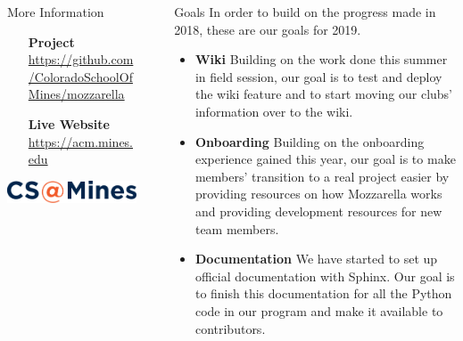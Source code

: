 \documentclass[final]{beamer}
\newlength{\sepwid}
\newlength{\onecolwid}
\begin{document}
\begin{frame}[t]
\begin{columns}[t]
\begin{column}{\onecolwid}
\begin{alertblock}{More Information}
\begin{enumerate}[leftmargin=11.5cm, labelsep=1cm]
                        \item[\textbf{Project}]
                            \href{https://github.com/ColoradoSchoolOfMines/mozzarella}{\url{https://github.com/ColoradoSchoolOfMines/mozzarella}}

                        \item[\textbf{Live Website}]
			    \href{https://acm.mines.edu}{\url{https://acm.mines.edu}}
                    \end{enumerate}

                \end{alertblock}
		\includegraphics[width=.95\linewidth]{csam.pdf}
            \end{column} %

            \begin{column}{\sepwid}\end{column} %

            \begin{column}{\onecolwid} %

                \begin{block}{Goals}
                    \setlength{\parskip}{0.5em}
		    In order to build on the progress made in 2018, these are
		    our goals for 2019.
                    \begin{itemize}

                        \item \textbf{Wiki} Building on the work done this
			    summer in field session, our goal is to test and
			    deploy the wiki feature and to start moving our
			    clubs' information over to the wiki.

                        \item \textbf{Onboarding} Building on the onboarding
			    experience gained this year, our goal is to make
			    members' transition to a real project easier by
			    providing resources on how Mozzarella works and
			    providing development resources for new team
			    members.

                        \item \textbf{Documentation} We have started to set up
			    official documentation with Sphinx. Our goal is to
			    finish this documentation for all the Python code in
			    our program and make it available to contributors.


\end{itemize}
\end{block}
\end{column}
\end{columns}
\end{frame}
\end{document}
